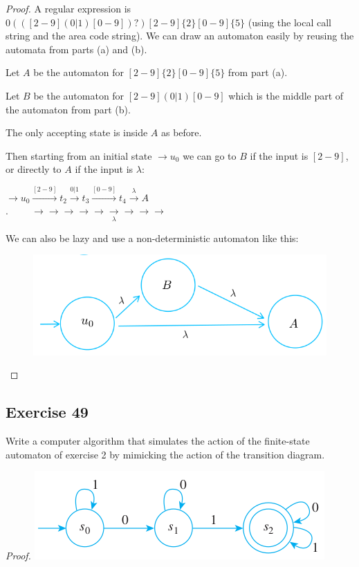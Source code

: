 \documentclass[14pt]{extarticle}
\begin{document}
\begin{proof}
    A regular expression is \(0(([2-9](0|1)[0-9])?)[2-9]\{2\}[0-9]\{5\}\) (using the local call string and the area code
    string). We can draw an automaton easily by reusing the automata from parts (a) and (b).

    Let \(A\) be the automaton for \([2-9]\{2\}[0-9]\{5\}\) from part (a).

    Let \(B\) be the automaton for \([2-9](0|1)[0-9]\) which is the middle part of the automaton from part (b).

    The only accepting state is inside \(A\) as before.

    Then starting from an initial state \(\to u_0\) we can go to \(B\) if the input is \([2-9]\), or directly to \(A\) if the
    input is \(\lambda\):

    \(\to u_0 \overset{[2-9]}{\to} t_2 \overset{0|1}{\to} t_3 \overset{[0-9]}{\to} t_4 \overset{\lambda}{\to} A\) \\
    \(.\hspace{1cm}\to\to\to\to\to\underset{\lambda}{\to}\to\to\to\)

    We can also be lazy and use a non-deterministic automaton like this:
    \begin{figure}[ht!]
        \centering
        \includegraphics[scale=0.4]{../images/12.2.48.c.png}
    \end{figure}
\end{proof}

\subsection{Exercise 49}
Write a computer algorithm that simulates the action of the finite-state automaton of exercise 2 by mimicking the action
of the transition diagram.

    {\it Proof.}
\includegraphics[scale=0.5]{../images/12.2.2.png}
\end{document}
